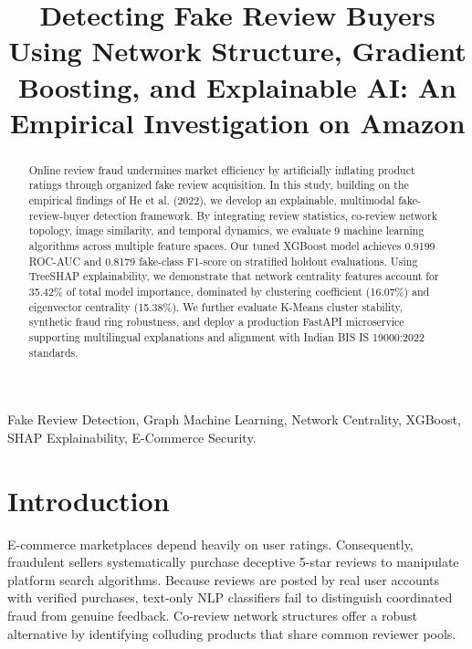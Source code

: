 \documentclass[conference]{IEEEtran}
\begin{document}
\title{Detecting Fake Review Buyers Using Network Structure, Gradient Boosting, and Explainable AI: An Empirical Investigation on Amazon}

\author{
}

\maketitle

\begin{abstract}
Online review fraud undermines market efficiency by artificially inflating product ratings through organized fake review acquisition. In this study, building on the empirical findings of He et al. (2022), we develop an explainable, multimodal fake-review-buyer detection framework. By integrating review statistics, co-review network topology, image similarity, and temporal dynamics, we evaluate 9 machine learning algorithms across multiple feature spaces. Our tuned XGBoost model achieves 0.9199 ROC-AUC and 0.8179 fake-class F1-score on stratified holdout evaluations. Using TreeSHAP explainability, we demonstrate that network centrality features account for 35.42\% of total model importance, dominated by clustering coefficient (16.07\%) and eigenvector centrality (15.38\%). We further evaluate K-Means cluster stability, synthetic fraud ring robustness, and deploy a production FastAPI microservice supporting multilingual explanations and alignment with Indian BIS IS 19000:2022 standards.
\end{abstract}

\begin{IEEEkeywords}
Fake Review Detection, Graph Machine Learning, Network Centrality, XGBoost, SHAP Explainability, E-Commerce Security.
\end{IEEEkeywords}

\section{Introduction}
E-commerce marketplaces depend heavily on user ratings. Consequently, fraudulent sellers systematically purchase deceptive 5-star reviews to manipulate platform search algorithms. Because reviews are posted by real user accounts with verified purchases, text-only NLP classifiers fail to distinguish coordinated fraud from genuine feedback. Co-review network structures offer a robust alternative by identifying colluding products that share common reviewer pools.
\end{document}
